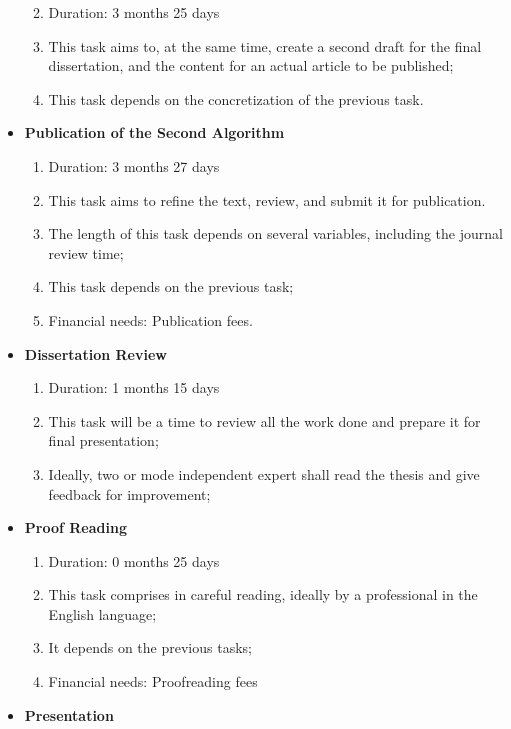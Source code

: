 \documentclass[runningheads]{llncs}
\providecommand{\tightlist}{%
  \setlength{\itemsep}{0pt}\setlength{\parskip}{0pt}}
\begin{document}
\begin{itemize}
  \begin{enumerate}
  \def\labelenumi{\arabic{enumi}.}
  \tightlist
  \item
    Duration: 3 months 25 days
  \item
    This task aims to, at the same time, create a second draft for the
    final dissertation, and the content for an actual article to be
    published;
  \item
    This task depends on the concretization of the previous task.
  \end{enumerate}
\item
  \textbf{Publication of the Second Algorithm}

  \begin{enumerate}
  \def\labelenumi{\arabic{enumi}.}
  \tightlist
  \item
    Duration: 3 months 27 days
  \item
    This task aims to refine the text, review, and submit it for
    publication.
  \item
    The length of this task depends on several variables, including the
    journal review time;
  \item
    This task depends on the previous task;
  \item
    Financial needs: Publication fees.
  \end{enumerate}
\item
  \textbf{Dissertation Review}

  \begin{enumerate}
  \def\labelenumi{\arabic{enumi}.}
  \tightlist
  \item
    Duration: 1 months 15 days
  \item
    This task will be a time to review all the work done and prepare it
    for final presentation;
  \item
    Ideally, two or mode independent expert shall read the thesis and
    give feedback for improvement;
  \end{enumerate}
\item
  \textbf{Proof Reading}

  \begin{enumerate}
  \def\labelenumi{\arabic{enumi}.}
  \tightlist
  \item
    Duration: 0 months 25 days
  \item
    This task comprises in careful reading, ideally by a professional in
    the English language;
  \item
    It depends on the previous tasks;
  \item
    Financial needs: Proofreading fees
  \end{enumerate}
\item
  \textbf{Presentation}


\end{itemize}
\end{document}
